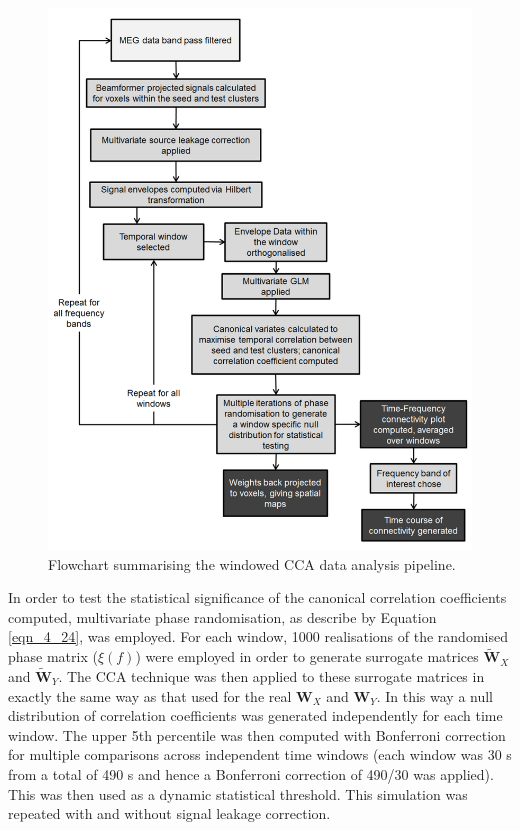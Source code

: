 \begin{figure}
	\includegraphics[width=\linewidth]{./images/chapter4/figure_3.png}\caption{Flowchart summarising the windowed CCA data analysis pipeline.}\label{fig_4_3}
\end{figure}

\clearpage
In order to test the statistical significance of the canonical correlation coefficients computed, multivariate phase randomisation, as describe by Equation \ref{eqn_4_24}, was employed. For each window, 1000 realisations of the randomised phase matrix ($\xi(f)$) were employed in order to generate surrogate matrices $\tilde{\mathbf{W}}_{X}$ and $\tilde{\mathbf{W}}_{Y}$. The CCA technique was then applied to these surrogate matrices in exactly the same way as that used for the real $\mathbf{W}_{X}$ and $\mathbf{W}_{Y}$. In this way a null distribution of correlation coefficients was generated independently for each time window. The upper 5th percentile was then computed with Bonferroni correction for multiple comparisons across independent time windows (each window was 30 s from a total of 490 s and hence a Bonferroni correction of 490/30 was applied). This was then used as a dynamic statistical threshold. This simulation was repeated with and without signal leakage correction.


